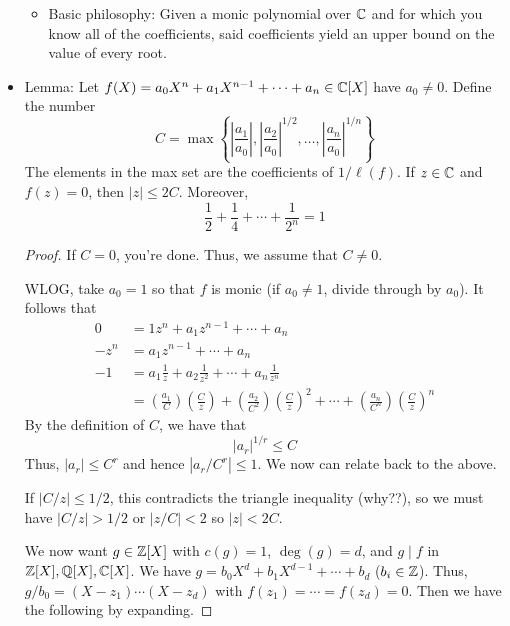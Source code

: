 \documentclass[../notes.tex]{subfiles}
\begin{document}
\begin{itemize}
    \begin{itemize}
        \item Basic philosophy: Given a monic polynomial over $\mathbb{C}$ and for which you know all of the coefficients, said coefficients yield an upper bound on the value of every root.
    \end{itemize}
    \item Lemma: Let $f(X)=a_0X^n+a_1X^{n-1}+\cdots+a_n\in\mathbb{C}[X]$ have $a_0\neq 0$. Define the number
    \begin{equation*}
        C = \max\left\{ \left| \frac{a_1}{a_0} \right|,\left| \frac{a_2}{a_0} \right|^{1/2},\dots,\left| \frac{a_n}{a_0} \right|^{1/n} \right\}
    \end{equation*}
    The elements in the max set are the coefficients of $1/\ell(f)$. If $z\in\mathbb{C}$ and $f(z)=0$, then $|z|\leq 2C$. Moreover,
    \begin{equation*}
        \frac{1}{2}+\frac{1}{4}+\cdots+\frac{1}{2^n} = 1
    \end{equation*}
    \begin{proof}
        If $C=0$, you're done. Thus, we assume that $C\neq 0$.\par
        WLOG, take $a_0=1$ so that $f$ is monic (if $a_0\neq 1$, divide through by $a_0$). It follows that
        \begin{align*}
            0 &= 1z^n+a_1z^{n-1}+\cdots+a_n\\
            -z^n &= a_1z^{n-1}+\cdots+a_n\\
            -1 &= a_1\frac{1}{z}+a_2\frac{1}{z^2}+\cdots+a_n\frac{1}{z^n}\\
            &= \left( \frac{a_1}{C} \right)\left( \frac{C}{z} \right)+\left( \frac{a_2}{C^2} \right)\left( \frac{C}{z} \right)^2+\cdots+\left( \frac{a_n}{C^n} \right)\left( \frac{C}{z} \right)^n
        \end{align*}
        By the definition of $C$, we have that
        \begin{equation*}
            |a_r|^{1/r} \leq C
        \end{equation*}
        Thus, $|a_r|\leq C^r$ and hence $|a_r/C^r|\leq 1$. We now can relate back to the above.\par
        If $|C/z|\leq 1/2$, this contradicts the triangle inequality (why??), so we must have $|C/z|>1/2$ or $|z/C|<2$ so $|z|<2C$.\par
        We now want $g\in\mathbb{Z}[X]$ with $c(g)=1$, $\deg(g)=d$, and $g\mid f$ in $\mathbb{Z}[X],\mathbb{Q}[X],\mathbb{C}[X]$.
        We have $g=b_0X^d+b_1X^{d-1}+\cdots+b_d$ ($b_i\in\mathbb{Z}$). Thus, $g/b_0=(X-z_1)\cdots(X-z_d)$ with $f(z_1)=\cdots=f(z_d)=0$. Then we have the following by expanding.

\end{proof}
\end{itemize}
\end{document}
